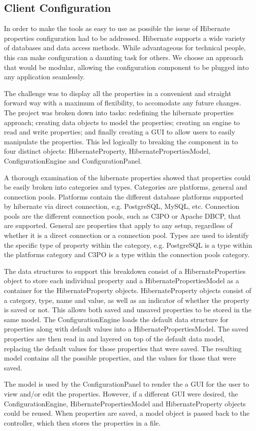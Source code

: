 \subsection{Client Configuration}
In order to make the tools as easy to use as possible the issue of Hibernate properties configuration had to be addressed. Hibernate supports a wide variety of databases and data access methods. While advantageous for technical people, this can make configuration a daunting task for others. We choose an approach that would be modular, allowing the configuration component to be plugged into any application seamlessly.  

The challenge was to display all the properties in a convenient and straight forward way with a maximum of flexibility, to accomodate any future changes. The project was broken down into tasks: redefining the hibernate properties approach; creating data objects to model the properties; creating an engine to read and write properties; and finally creating a GUI to allow users to easily manipulate the properties. This led logically to breaking the component in to four distinct objects: HibernateProperty, HibernatePropertiesModel, ConfigurationEngine and ConfigurationPanel. 

A thorough examination of the hibernate properties showed that properties could be easily broken into categories and types. Categories are platforms, general and connection pools. Platforms contain the different database platforms supported by hibernate via direct connection, e.g. PostgreSQL, MySQL, etc. Connection pools are the different connection pools, such as C3PO or Apache DBCP, that are supported. General are properties that apply to any setup, regardless of whether it is a direct connection or a connection pool. Types are used to identify the specific type of property within the category, e.g. PostgreSQL is a type within the platforms category and C3PO is a type within the connection pools category.

The data structures to support this breakdown consist of a HibernateProperties object to store each individual property and a HibernatePropertiesModel as a container for the HibernateProperty objects. HibernateProperty objects consist of a category, type, name and value, as well as an indicator of whether the property is saved or not. This allows both saved and unsaved properties to be stored in the same model. The ConfigurationEngine loads the default data structure for properties along with default values into a HibernatePropertiesModel. The saved properties are then read in and layered on top of the default data model, replacing the default values for those properties that were saved. The resulting model contains all the possible properties, and the values for those that were saved. 

The model is used by the ConfigurationPanel to render the a GUI for the user to view and/or edit the properties. However, if a different GUI were desired, the  ConfigurationEngine, HibernatePropertiesModel and HibernateProperty objects could be reused. When properties are saved, a model object is passed back to the controller, which then stores the properties in a file.



